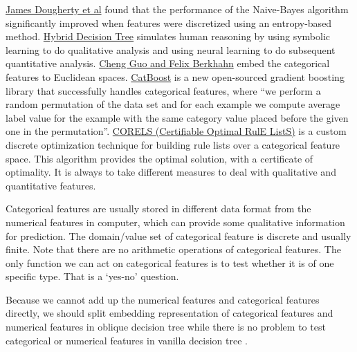 \documentclass[UTF8]{article}
\begin{document}
\href{https://www.sciencedirect.com/science/article/pii/B9781558603776500323}{James Dougherty et al}
found that the performance of the Naive-Bayes algorithm significantly
improved when features were discretized using an entropy-based method.
\href{https://cs.nju.edu.cn/zhouzh/zhouzh.files/publication/kbs02.pdf}{Hybrid Decision Tree}\cite{zhou2002hybrid}
simulates human reasoning by using
symbolic learning to do qualitative analysis and using neural learning to do subsequent quantitative analysis.
\href{https://arxiv.org/abs/1604.06737}{Cheng Guo and Felix Berkhahn}\cite{guo2016entity}
embed the categorical features to Euclidean spaces.
\href{http://learningsys.org/nips17/assets/papers/paper_11.pdf}{CatBoost}\cite{prokhorenkova2017catboost:}
is a new open-sourced gradient boosting library
that successfully handles categorical features, where
``we perform a random permutation of the data set and for each example we
compute average label value for the example with the same category value placed before the given
one in the permutation''.
\href{https://corels.eecs.harvard.edu/corels/index.html}{CORELS (Certifiable Optimal RulE ListS)}
is a custom discrete optimization technique for building rule lists over a categorical feature space.
This algorithm provides the optimal solution, with a certificate of optimality.
It is always to take different measures to deal with qualitative and quantitative features.

Categorical features are usually stored in different data format from the numerical features in computer,
which can provide some qualitative information for prediction.
The domain/value set of categorical feature is discrete and usually finite.
Note that there are no arithmetic operations of categorical features.
The only function we can act on categorical features is to test whether it is of one specific type.
That is a `yes-no' question.


Because we cannot add up the numerical features and categorical features directly,
we should split embedding representation of categorical features and numerical features in oblique decision tree
while there is no problem  to test categorical or numerical features in vanilla decision tree \footnotemark.
\end{document}
